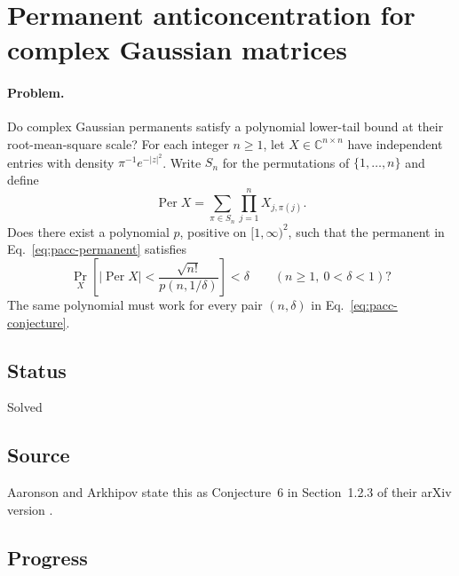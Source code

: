 \section{Permanent anticoncentration for complex Gaussian matrices}
\label{sec:op_c509b64359fbdc2d}

\paragraph{Problem.}
Do complex Gaussian permanents satisfy a polynomial lower-tail bound at their root-mean-square scale?
For each integer $n\geq1$, let $X\in\mathbb C^{n\times n}$ have independent entries with density $\pi^{-1}e^{-|z|^2}$.
Write $S_n$ for the permutations of $\{1,\ldots,n\}$ and define
\begin{equation}
 \operatorname{Per}X=\sum_{\pi\in S_n}\prod_{j=1}^nX_{j,\pi(j)}.
 \label{eq:pacc-permanent}
\end{equation}
Does there exist a polynomial $p$, positive on $[1,\infty)^2$, such that the permanent in Eq.~\eqref{eq:pacc-permanent} satisfies
\begin{equation}
 \Pr_X\!\left[|\operatorname{Per}X|<
       \frac{\sqrt{n!}}{p(n,1/\delta)}\right]<\delta
 \qquad(n\geq1,\ 0<\delta<1)?
 \label{eq:pacc-conjecture}
\end{equation}
The same polynomial must work for every pair $(n,\delta)$ in Eq.~\eqref{eq:pacc-conjecture}.

\subsection*{Status}

Solved

\subsection*{Source}

Aaronson and Arkhipov state this as Conjecture~6 in Section~1.2.3 of their arXiv version .

\subsection*{Progress}

